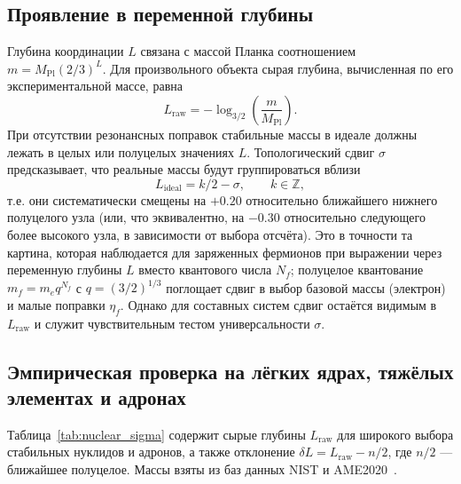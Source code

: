 \documentclass[12pt,a4paper]{article}
\begin{document}
	\subsection{Проявление в переменной глубины}
	
	Глубина координации \(L\) связана с массой Планка соотношением \(m = M_{\mathrm{Pl}}(2/3)^L\). Для произвольного объекта сырая глубина, вычисленная по его экспериментальной массе, равна
	\begin{equation}
		L_{\mathrm{raw}} = -\log_{3/2}\!\left(\frac{m}{M_{\mathrm{Pl}}}\right).
	\end{equation}
	При отсутствии резонансных поправок стабильные массы в идеале должны лежать в целых или полуцелых значениях \(L\). Топологический сдвиг \(\sigma\) предсказывает, что реальные массы будут группироваться вблизи
	\[
	L_{\mathrm{ideal}} = k/2 - \sigma, \qquad k\in\mathbb{Z},
	\]
	т.е. они систематически смещены на \(+0.20\) относительно ближайшего нижнего полуцелого узла (или, что эквивалентно, на \(-0.30\) относительно следующего более высокого узла, в зависимости от выбора отсчёта). Это в точности та картина, которая наблюдается для заряженных фермионов при выражении через переменную глубины \(L\) вместо квантового числа \(N_f\); полуцелое квантование \(m_f = m_e q^{N_f}\) с \(q=(3/2)^{1/3}\) поглощает сдвиг в выбор базовой массы (электрон) и малые поправки \(\eta_f\). Однако для составных систем сдвиг остаётся видимым в \(L_{\mathrm{raw}}\) и служит чувствительным тестом универсальности \(\sigma\).
	
	\subsection{Эмпирическая проверка на лёгких ядрах, тяжёлых элементах и адронах}
	
	Таблица~\ref{tab:nuclear_sigma} содержит сырые глубины \(L_{\mathrm{raw}}\) для широкого выбора стабильных нуклидов и адронов, а также отклонение \(\delta L = L_{\mathrm{raw}} - n/2\), где \(n/2\) — ближайшее полуцелое. Массы взяты из баз данных NIST и AME2020~\cite{AME2020}.
	
\end{document}
